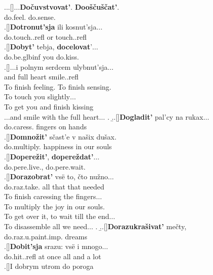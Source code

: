 \ex.\label{ex:poem}\a.\label{poem:a}\ag.[]$\ldots$\textbf{Do\v{c}uvstvovat'}. \textbf{Doo\v{s}\v{c}u\v{s}\v{c}at'}.\\
do.feel. do.sense.\\
\bg.[]\textbf{Dotronut'sja} ili kosnut'sja$\ldots$\\
do.touch..refl or touch..refl\\
\bg.[]\textbf{Dobyt'} tebja, \textbf{docelovat}'$\ldots$\\
do.be.glb{inf} you do.kiss.\\
\bg.[]$\ldots$i polnym serdcem ulybnut'sja$\ldots$\\
and full heart smile..refl\\
\vspace{0.5em}
To finish feeling. To finish sensing.\\
To touch you slightly$\ldots$\\
To get you and finish kissing\\
$\ldots$and smile with the full heart$\ldots$
\z.
\b.\label{poem:b}\ag.[]\textbf{Dogladit'} pal'cy na rukax$\ldots$\\
do.caress. fingers on hands\\
\bg.[]\textbf{Domno\v{z}it'} s\v{c}ast'e v na\v{s}ix du\v{s}ax.\\
do.multiply. happiness in our souls\\
\bg.[]\textbf{Dopere\v{z}it'}, \textbf{dopere\v{z}dat'}$\ldots$\\
do.pere.live., do.pere.wait.\\
\bg.[]\textbf{Dorazobrat'} vs\"{e} to, \v{c}to nu\v{z}no$\ldots$ \\
do.raz.take. all that that needed\\
\vspace{0.5em}
To finish caressing the fingers$\ldots$\\
To multiply the joy in our souls.\\
To get over it, to wait till the end$\ldots$\\
To disassemble all we need$\ldots$
\z.
\b.\label{poem:c}\ag.[]\textbf{Dorazukra\v{s}ivat'} me\v{c}ty,\\
do.raz.u.paint.imp. dreams\\
\bg.[]\textbf{Dobit'sja} srazu: vs\"{e} i mnogo$\ldots$\\
do.hit..refl {at once} all and {a lot}\\
\bg.[]I dobrym utrom do poroga\\
